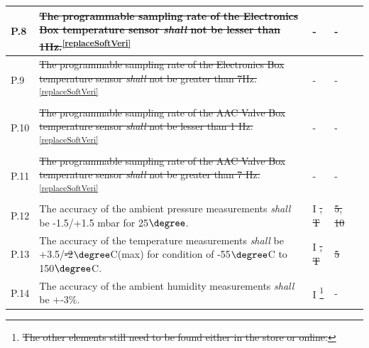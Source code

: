 \documentclass[a4paper,12pt,twoside]{article}
\providecommand{\DIFaddtex}[1]{{\protect\color{blue}\uwave{#1}}} %
\providecommand{\DIFdeltex}[1]{{\protect\color{red}\sout{#1}}}                      %
\providecommand{\DIFaddbegin}{} %
\providecommand{\DIFaddend}{} %
\providecommand{\DIFdelbegin}{} %
\providecommand{\DIFdelend}{} %
\providecommand{\DIFadd}[1]{\texorpdfstring{\DIFaddtex{#1}}{#1}} %
\providecommand{\DIFdel}[1]{\texorpdfstring{\DIFdeltex{#1}}{}} %
\newcommand{\DIFscaledelfig}{0.5}
\newlength{\DIFdelgraphicswidth} %
\newlength{\DIFdelgraphicsheight} %
\newcommand{\DIFaddincludegraphics}[2][]{{\color{blue}\fbox{\DIFOincludegraphics[#1]{#2}}}} %
\newcommand{\DIFdelincludegraphics}[2][]{%
\sbox{\DIFdelgraphicsbox}{\DIFOincludegraphics[#1]{#2}}%
\settoboxwidth{\DIFdelgraphicswidth}{\DIFdelgraphicsbox} %
\settoboxtotalheight{\DIFdelgraphicsheight}{\DIFdelgraphicsbox} %
\scalebox{\DIFscaledelfig}{%
\parbox[b]{\DIFdelgraphicswidth}{\usebox{\DIFdelgraphicsbox}\\[-\baselineskip] \rule{\DIFdelgraphicswidth}{0em}}\llap{\resizebox{\DIFdelgraphicswidth}{\DIFdelgraphicsheight}{%
\setlength{\unitlength}{\DIFdelgraphicswidth}%
\begin{picture}(1,1)%
\thicklines\linethickness{2pt} %
{\color[rgb]{1,0,0}\put(0,0){\framebox(1,1){}}}%
{\color[rgb]{1,0,0}\put(0,0){\line( 1,1){1}}}%
{\color[rgb]{1,0,0}\put(0,1){\line(1,-1){1}}}%
\end{picture}%
}\hspace*{3pt}}} %
} %
\DeclareRobustCommand{\DIFaddbegin}{\DIFOaddbegin \let\includegraphics\DIFaddincludegraphics} %
\DeclareRobustCommand{\DIFaddend}{\DIFOaddend \let\includegraphics\DIFOincludegraphics} %
\DeclareRobustCommand{\DIFdelbegin}{\DIFOdelbegin \let\includegraphics\DIFdelincludegraphics} %
\DeclareRobustCommand{\DIFdelend}{\DIFOaddend \let\includegraphics\DIFOincludegraphics} %
\begin{document}
\begin{longtable}[]{|m{}| m{} |m{} |m{}|m{}|}
P.8  & \st{The programmable sampling rate of the Electronics Box temperature sensor \textit{shall} not be lesser than 1Hz.}\textsuperscript{\ref{replaceSoftVeri}}                                                                          &       -       & -            &        \\ \hline
P.9  & \st{The programmable sampling rate of the Electronics Box temperature sensor \textit{shall} not be greater than 7Hz. }\textsuperscript{\ref{replaceSoftVeri}}                                                                        &        -    & -        &        \\ \hline
P.10 & \st{The programmable sampling rate of the AAC Valve Box temperature sensor \textit{shall} not be lesser than 1 Hz. }\textsuperscript{\ref{replaceSoftVeri}}                                                                  & -    & -        &        \\ \hline
P.11 & \st{The programmable sampling rate of the AAC Valve Box temperature sensor \textit{shall} not be greater than 7 Hz. }\textsuperscript{\ref{replaceSoftVeri}}                                                                 &  -    &   -      &        \\ \hline
P.12 & The accuracy of the ambient pressure measurements \textit{shall} be -1.5/+1.5 mbar for 25$\degree$.                                                                              &        I      \DIFdelbegin \DIFdel{, T      }\DIFdelend &  \DIFdelbegin \DIFdel{5, 10           }\DIFdelend \DIFaddbegin \DIFadd{-          }\DIFaddend & \DIFaddbegin \DIFadd{Pass       }\DIFaddend \\ \hline
P.13 & The accuracy of the temperature measurements \textit{shall} be +3.5/\DIFdelbegin \DIFdel{-2}\DIFdelend \DIFaddbegin \DIFadd{-3}\DIFaddend $\degree$C(max) for condition of -55$\degree$C to 150$\degree$C.                                   &       I       \DIFdelbegin \DIFdel{, T       }\DIFdelend & \DIFdelbegin \DIFdel{5            }\DIFdelend \DIFaddbegin \DIFadd{-            }\DIFaddend &    \DIFaddbegin \DIFadd{Pass    }\DIFaddend \\ \hline
P.14 & The accuracy of the ambient humidity measurements \textit{shall} be +-3\%.                                                                                                         &       I         \DIFdelbegin \footnote{\DIFdel{The other elements still need to be found either in the store or online. }%
}        %
\addtocounter{footnote}{-1}%
\DIFdelend &  -           & \DIFaddbegin \DIFadd{Pass        }\DIFaddend \\ \hline

\end{longtable}
\end{document}
